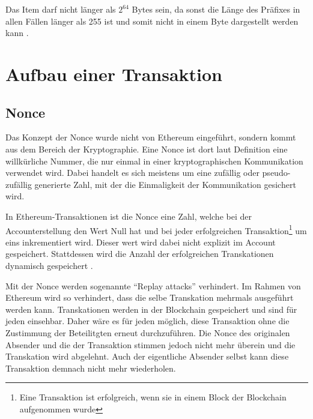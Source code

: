 \documentclass[runningheads]{llncs}
\begin{document}
Das Item darf nicht länger als $2^{64}$ Bytes sein, da sonst die Länge des Präfixes in allen Fällen länger als 255 ist und somit nicht in einem Byte dargestellt werden kann \cite[S.18,19]{wood_ethereum/yellowpaper_2019}.
\section{Aufbau einer Transaktion}

\subsection{Nonce}
\label{nonce}
Das Konzept der Nonce wurde nicht von Ethereum eingeführt, sondern kommt aus dem Bereich der Kryptographie. Eine Nonce ist dort laut Definition \cite{noauthor_ethereum/wiki/rlp_nodate}
eine willkürliche Nummer, die nur einmal in einer kryptographischen Kommunikation verwendet wird. Dabei handelt es sich meistens um eine zufällig oder pseudo-zufällig generierte Zahl, mit der die Einmaligkeit der Kommunikation gesichert wird.

In Ethereum-Transaktionen ist die Nonce eine Zahl, welche bei der Accounterstellung den Wert Null hat und bei jeder erfolgreichen Transaktion\footnote{Eine Transaktion ist erfolgreich, wenn sie in einem Block der Blockchain aufgenommen wurde} um eins inkrementiert wird. Dieser wert wird dabei nicht explizit im Account gespeichert. Stattdessen wird die Anzahl der erfolgreichen Transkationen dynamisch gespeichert \cite[S.101]{antonopoulos_mastering_2019}.

Mit der Nonce werden sogenannte "`Replay attacks"' verhindert. Im Rahmen von Ethereum wird so verhindert, dass die selbe Transkation mehrmals ausgeführt werden kann. Transkationen werden in der Blockchain gespeichert und sind für jeden einsehbar. Daher wäre es für jeden möglich, diese Transaktion ohne die Zustimmung der Beteilitgten erneut durchzuführen. Die Nonce des originalen Absender und die der Transaktion stimmen jedoch nicht mehr überein und die Transkation wird abgelehnt. Auch der eigentliche Absender selbst kann diese Transaktion demnach nicht mehr wiederholen.
\end{document}
